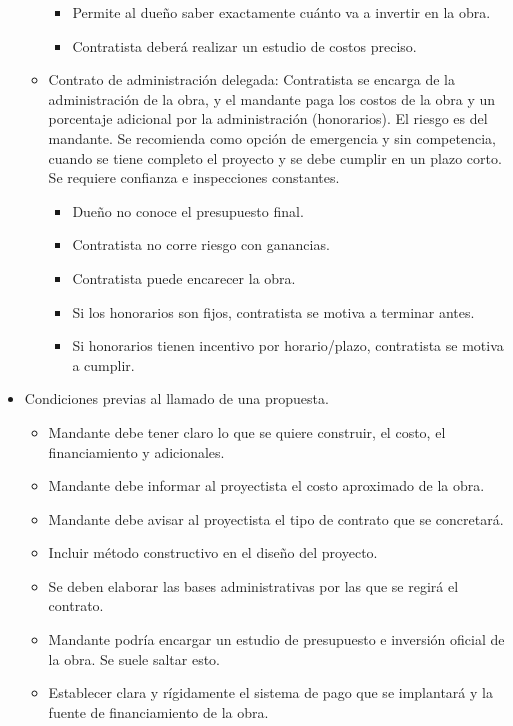 \begin{itemize}
\begin{itemize}
\begin{itemize}
            \item Permite al dueño saber exactamente cuánto va a invertir en la obra.
            \item Contratista deberá realizar un estudio de costos preciso.
        \end{itemize}
        \item Contrato de administración delegada: Contratista se encarga de la administración de la obra, y el mandante paga los costos de la obra y un porcentaje adicional por la administración (honorarios). El riesgo es del mandante. Se recomienda como opción de emergencia y sin competencia, cuando se tiene completo el proyecto y se debe cumplir en un plazo corto. Se requiere confianza e inspecciones constantes.
        \begin{itemize}
            \item Dueño no conoce el presupuesto final.
            \item Contratista no corre riesgo con ganancias.
            \item Contratista puede encarecer la obra.
            \item Si los honorarios son fijos, contratista se motiva a terminar antes.
            \item Si honorarios tienen incentivo por horario/plazo, contratista se motiva a cumplir.
        \end{itemize}
    \end{itemize}
    \item Condiciones previas al llamado de una propuesta.
    \begin{itemize}
        \item Mandante debe tener claro lo que se quiere construir, el costo, el financiamiento y adicionales.
        \item Mandante debe informar al proyectista el costo aproximado de la obra.
        \item Mandante debe avisar al proyectista el tipo de contrato que se concretará.
        \item Incluir método constructivo en el diseño del proyecto.
        \item Se deben elaborar las bases administrativas por las que se regirá el contrato.
        \item Mandante podría encargar un estudio de presupuesto e inversión oficial de la obra. Se suele saltar esto.
        \item Establecer clara y rígidamente el sistema de pago que se implantará y la fuente de financiamiento de la obra.

\end{itemize}
\end{itemize}
